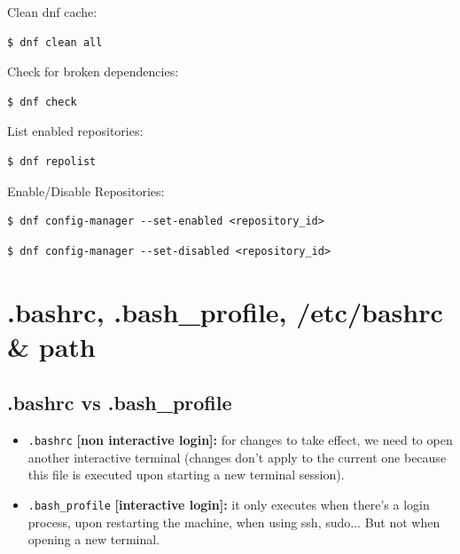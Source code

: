 \documentclass{article}
\newenvironment{codetemplate}[1][]{%
  \mybasecolorbox[#1]
  \itshape
}{%
  \endmybasecolorbox
}
\begin{document}
Clean dnf cache:
\begin{codetemplate}
\begin{verbatim}
$ dnf clean all
\end{verbatim}
\end{codetemplate}

Check for broken dependencies:
\begin{codetemplate}
\begin{verbatim}
$ dnf check
\end{verbatim}
\end{codetemplate}

List enabled repositories:
\begin{codetemplate}
\begin{verbatim}
$ dnf repolist
\end{verbatim}
\end{codetemplate}

Enable/Disable Repositories:
\begin{codetemplate}
\begin{verbatim}
$ dnf config-manager --set-enabled <repository_id>
\end{verbatim}
\end{codetemplate}
\begin{codetemplate}
\begin{verbatim}
$ dnf config-manager --set-disabled <repository_id>
\end{verbatim}
\end{codetemplate}

\newpage
\section{.bashrc, .bash\_profile, /etc/bashrc \& path}

\subsection{.bashrc vs .bash\_profile}

\begin{itemize}
    \item \verb|.bashrc| \textbf{[non interactive login]:} for changes to take effect, we need to open another interactive terminal (changes don't apply to the current one because this file is executed upon starting a new terminal session).
    \item \verb|.bash_profile| \textbf{[interactive login]:} it only executes when there's a login process, upon restarting the machine, when using ssh, sudo... But not when opening a new terminal.
\end{itemize}
\end{document}
